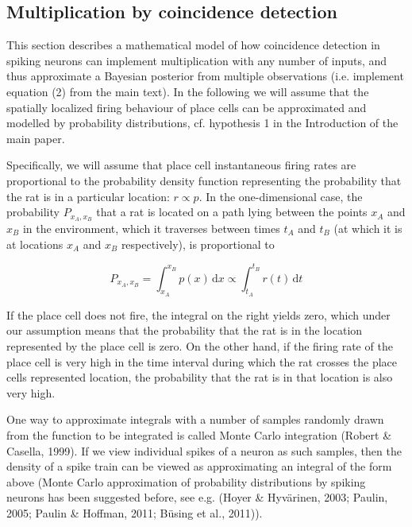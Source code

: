 \subsection*{Multiplication by coincidence detection}

This section describes a mathematical model of how coincidence detection in spiking neurons can implement multiplication with any number of inputs, and thus approximate a Bayesian posterior from multiple observations (i.e. implement equation (2) from the main text). In the following we will assume that the spatially localized firing behaviour of place cells can be approximated and modelled by probability distributions, cf. hypothesis 1 in the Introduction of the main paper. 


Specifically, we will assume that place cell instantaneous firing rates are proportional to the probability density function representing the probability that the rat is in a particular location: $ r \propto p $. In the one-dimensional case, the probability $ P_{x_A,x_B} $ that a rat is located on a path lying between the points $ x_A $ and $ x_B $ in the environment, which it traverses between times $ t_A $ and $ t_B $ (at which it is at locations $x_A$ and $x_B$ respectively), is proportional to 

\begin{equation}\label{FrEq}
P_{x_A,x_B} = \int_{x_A}^{x_B}{p(x) \, \mathrm{d}x} \propto \int_{t_A}^{t_B}{r(t) \, \mathrm{d}t}
\end{equation} 

If the place cell does not fire, the integral on the right yields zero, which under our assumption means that the probability that the rat is in the location represented by the place cell is zero. On the other hand, if the firing rate of the place cell is very high in the time interval during which the rat crosses the place cells represented location, the probability that the rat is in that location is also very high.

One way to approximate integrals with a number of samples randomly drawn from the function to be integrated is called Monte Carlo integration (Robert \& Casella, 1999). If we view individual spikes of a neuron as such samples, then the density of a spike train can be viewed as approximating an integral of the form above (Monte Carlo approximation of probability distributions by spiking neurons has been suggested before, see e.g. (Hoyer \& Hyvärinen, 2003; Paulin, 2005; Paulin \& Hoffman, 2011; Büsing et al., 2011)). 

